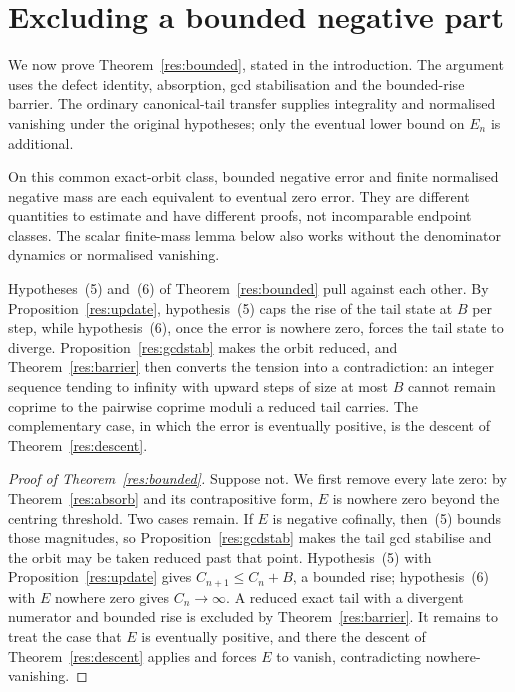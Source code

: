\section{Excluding a bounded negative part}\label{sec:bounded}

We now prove Theorem~\ref{res:bounded}, stated in the introduction.
The argument uses the defect identity, absorption, gcd stabilisation and the
bounded-rise barrier.  The ordinary canonical-tail transfer supplies
integrality and normalised vanishing under the original hypotheses; only
the eventual lower bound on $E_n$ is additional.

On this common exact-orbit class, bounded negative error and finite
normalised negative mass are each equivalent to eventual zero error.
They are different quantities to estimate and have different proofs, not
incomparable endpoint classes.  The scalar finite-mass lemma below also
works without the denominator dynamics or normalised vanishing.

Hypotheses~(5) and~(6) of Theorem~\ref{res:bounded} pull against each other.  By
Proposition~\ref{res:update}, hypothesis~(5) caps the rise of the tail state at
$B$ per step, while hypothesis~(6), once the error is nowhere zero, forces the
tail state to diverge.  Proposition~\ref{res:gcdstab} makes the orbit reduced,
and Theorem~\ref{res:barrier} then converts the tension into a contradiction:
an integer sequence tending to infinity with upward steps of size at most $B$
cannot remain coprime to the pairwise coprime moduli a reduced tail carries.
The
complementary case, in which the error is eventually positive, is the descent
of Theorem~\ref{res:descent}.

\begin{proof}[Proof of Theorem~\ref{res:bounded}]
Suppose not.  We first remove every late zero: by Theorem~\ref{res:absorb} and
its contrapositive form, $E$ is nowhere zero beyond the centring threshold.
Two cases remain.  If $E$ is negative cofinally,
then~(5) bounds those magnitudes, so Proposition~\ref{res:gcdstab} makes the
tail gcd stabilise and the orbit may be taken reduced past that point.
Hypothesis~(5) with
Proposition~\ref{res:update} gives $C_{n+1}\le C_n+B$, a bounded rise;
hypothesis~(6) with $E$ nowhere zero gives $C_n\to\infty$.  A reduced exact
tail with a divergent numerator and bounded rise is excluded by
Theorem~\ref{res:barrier}.  It remains to treat the case that $E$ is eventually
positive, and there the descent
of Theorem~\ref{res:descent} applies and forces $E$ to vanish, contradicting
nowhere-vanishing.
\end{proof}


